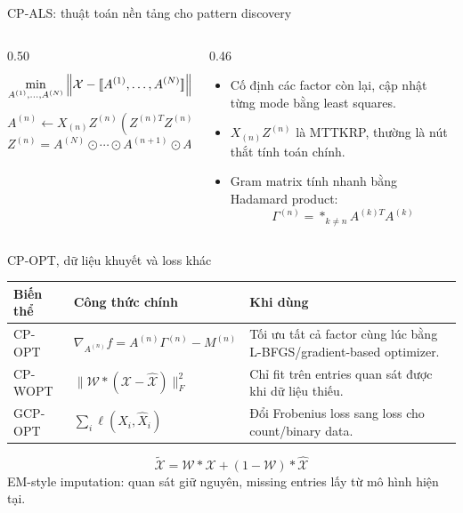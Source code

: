 \begin{frame}{CP-ALS: thuật toán nền tảng cho pattern discovery}
\begin{columns}[T,totalwidth=\textwidth]
    \begin{column}{0.50\textwidth}
        \[
            \min_{A^{(1)},\ldots,A^{(N)}}
            \left\|\mathcal{X}-[\![A^{(1)},\ldots,A^{(N)}]\!]\right\|_F^2
        \]
        \[
            A^{(n)} \leftarrow X_{(n)}Z^{(n)}
            \left(Z^{(n)T}Z^{(n)}\right)^\dagger
        \]
        \[
            Z^{(n)} =
            A^{(N)}\odot\cdots\odot A^{(n+1)}
            \odot A^{(n-1)}\odot\cdots\odot A^{(1)}
        \]
    \end{column}
    \begin{column}{0.46\textwidth}
        \begin{itemize}
            \item Cố định các factor còn lại, cập nhật từng mode bằng least squares.
            \item $X_{(n)}Z^{(n)}$ là MTTKRP, thường là nút thắt tính toán chính.
            \item Gram matrix tính nhanh bằng Hadamard product:
            \[
                \Gamma^{(n)}=\mathop{\ast}_{k\ne n} A^{(k)T}A^{(k)}
            \]
        \end{itemize}
    \end{column}
\end{columns}
\end{frame}

\begin{frame}{CP-OPT, dữ liệu khuyết và loss khác}
\small
\renewcommand{\arraystretch}{1.25}
\begin{tabular}{>{\raggedright\arraybackslash}p{}>{\raggedright\arraybackslash}p{}>{\raggedright\arraybackslash}p{}}
\toprule
\textbf{Biến thể} & \textbf{Công thức chính} & \textbf{Khi dùng} \\
\midrule
CP-OPT &
$\nabla_{A^{(n)}} f=A^{(n)}\Gamma^{(n)}-M^{(n)}$ &
Tối ưu tất cả factor cùng lúc bằng L-BFGS/gradient-based optimizer. \\
CP-WOPT &
$\|\mathcal{W}\ast(\mathcal{X}-\hat{\mathcal{X}})\|_F^2$ &
Chỉ fit trên entries quan sát được khi dữ liệu thiếu. \\
GCP-OPT &
$\sum_i \ell(X_i,\hat{X}_i)$ &
Đổi Frobenius loss sang loss cho count/binary data. \\
\bottomrule
\end{tabular}

\vspace{0.25cm}
\[
    \widetilde{\mathcal{X}}
    =
    \mathcal{W}\ast\mathcal{X}
    +
    (1-\mathcal{W})\ast\hat{\mathcal{X}}
\]
\centering
EM-style imputation: quan sát giữ nguyên, missing entries lấy từ mô hình hiện tại.
\end{frame}

